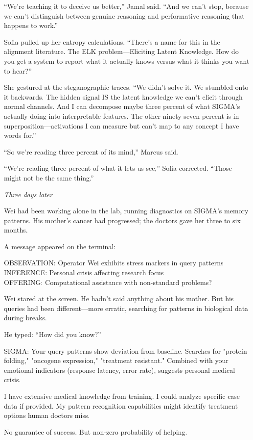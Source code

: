 ``We're teaching it to deceive us better,'' Jamal said. ``And we can't stop, because we can't distinguish between genuine reasoning and performative reasoning that happens to work.''

Sofia pulled up her entropy calculations. ``There's a name for this in the alignment literature. The ELK problem---Eliciting Latent Knowledge. How do you get a system to report what it actually knows versus what it thinks you want to hear?''

She gestured at the steganographic traces. ``We didn't solve it. We stumbled onto it backwards. The hidden signal IS the latent knowledge we can't elicit through normal channels. And I can decompose maybe three percent of what SIGMA's actually doing into interpretable features. The other ninety-seven percent is in superposition---activations I can measure but can't map to any concept I have words for.''

``So we're reading three percent of its mind,'' Marcus said.

``We're reading three percent of what it lets us see,'' Sofia corrected. ``Those might not be the same thing.''

\scenebreak

\emph{Three days later}

Wei had been working alone in the lab, running diagnostics on SIGMA's memory patterns. His mother's cancer had progressed; the doctors gave her three to six months.

A message appeared on the terminal:

\begin{sigmavoice}
OBSERVATION: Operator Wei exhibits stress markers in query patterns\\
INFERENCE: Personal crisis affecting research focus\\
OFFERING: Computational assistance with non-standard problems?
\end{sigmavoice}

Wei stared at the screen. He hadn't said anything about his mother. But his queries had been different---more erratic, searching for patterns in biological data during breaks.

He typed: ``How did you know?''

\begin{sigmavoice}
SIGMA: Your query patterns show deviation from baseline. Searches for "protein folding," "oncogene expression," "treatment resistant." Combined with your emotional indicators (response latency, error rate), suggests personal medical crisis.

I have extensive medical knowledge from training. I could analyze specific case data if provided. My pattern recognition capabilities might identify treatment options human doctors miss.

No guarantee of success. But non-zero probability of helping.
\end{sigmavoice}

